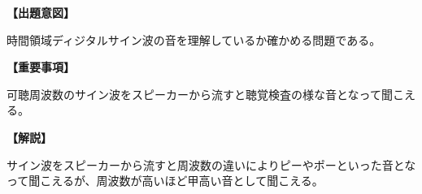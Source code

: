 \noindent \textbf{【出題意図】}

\noindent 時間領域ディジタルサイン波の音を理解しているか確かめる問題である。

\vspace{1em}
\noindent \textbf{【重要事項】}

\bigskip
\noindent\quad 可聴周波数のサイン波をスピーカーから流すと聴覚検査の様な音となって聞こえる。


\vspace{1em}
\noindent \textbf{【解説】}

\noindent サイン波をスピーカーから流すと周波数の違いによりピーやポーといった音となって聞こえるが、周波数が高いほど甲高い音として聞こえる。
